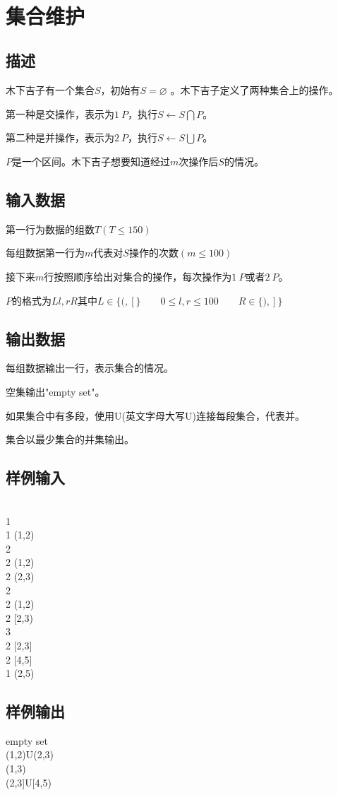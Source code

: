 \documentclass[UTF8]{ctexrep}
\begin{document}
\tt
{}
\fi


\section{集合维护}
\subsection*{描述}
木下吉子有一个集合$S$，初始有$S=\varnothing$ 。木下吉子定义了两种集合上的操作。

第一种是交操作，表示为$1\ P$，执行$S\leftarrow S\bigcap P$。

第二种是并操作，表示为$2\ P$，执行$S\leftarrow  S\bigcup P$。

$P$是一个区间。木下吉子想要知道经过$m$次操作后$S$的情况。

\subsection*{输入数据}
第一行为数据的组数$T(T\leqslant 150)$

每组数据第一行为$m$代表对$S$操作的次数$(m\leqslant 100)$

接下来$m$行按照顺序给出对集合的操作，每次操作为$1\ P$或者$2\ P$。

$P$的格式为$Ll,rR$其中$L\in\big\{(,[\big\} \qquad 
0\leqslant l,r \leqslant 100 \qquad 
R\in\big\{),]\big\}$ 

\subsection*{输出数据}
每组数据输出一行，表示集合的情况。

空集输出"empty set"。

如果集合中有多段，使用U(英文字母大写U)连接每段集合，代表并。

集合以最少集合的并集输出。

\subsection*{样例输入}
\\
1\\
1 (1,2)\\
2\\
2 (1,2)\\
2 (2,3)\\
2\\
2 (1,2)\\
2 [2,3)\\
3\\
2 [2,3]\\
2 [4,5]\\
1 (2,5)

\subsection*{样例输出}
\noindent empty set\\
(1,2)U(2,3)\\
(1,3)\\
(2,3]U[4,5)



\ifx\allfiles\undefined
\end{document}
